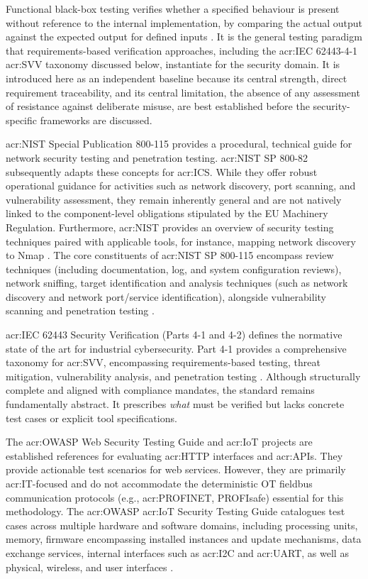 Functional black-box testing verifies whether a specified behaviour is present without reference to the internal implementation, by comparing the actual output against the expected output for defined inputs \cite[p. 82]{1341418}. It is the general testing paradigm that requirements-based verification approaches, including the \gls{acr:IEC} 62443-4-1 \gls{acr:SVV} taxonomy discussed below, instantiate for the security domain. It is introduced here as an independent baseline because its central strength, direct requirement traceability, and its central limitation, the absence of any assessment of resistance against deliberate misuse, are best established before the security-specific frameworks are discussed.

\gls{acr:NIST} Special Publication 800-115 provides a procedural, technical guide for network security testing and penetration testing. \gls{acr:NIST} SP 800-82 subsequently adapts these concepts for \gls{acr:ICS}. While they offer robust operational guidance for activities such as network discovery, port scanning, and vulnerability assessment, they remain inherently general and are not natively linked to the component-level obligations stipulated by the EU Machinery Regulation. Furthermore, \gls{acr:NIST} provides an overview of security testing techniques paired with applicable tools, for instance, mapping network discovery to Nmap \cite[p. 65]{nist_sp800_115}. The core constituents of \gls{acr:NIST} SP 800-115 encompass review techniques (including documentation, log, and system configuration reviews), network sniffing, target identification and analysis techniques (such as network discovery and network port/service identification), alongside vulnerability scanning and penetration testing \cite[p. iv]{nist_sp800_115}. 

\gls{acr:IEC} 62443 Security Verification (Parts 4-1 and 4-2) defines the normative state of the art for industrial cybersecurity. Part 4-1 provides a comprehensive taxonomy for \gls{acr:SVV}, encompassing requirements-based testing, threat mitigation, vulnerability analysis, and penetration testing \cite[p. 37]{DIN_EN_IEC_62443_4_1_2018}. Although structurally complete and aligned with compliance mandates, the standard remains fundamentally abstract. It prescribes \textit{what} must be verified but lacks concrete test cases or explicit tool specifications. 

The \gls{acr:OWASP} Web Security Testing Guide and \gls{acr:IoT} projects are established references for evaluating \gls{acr:HTTP} interfaces and \glspl{acr:API}. They provide actionable test scenarios for web services. However, they are primarily \gls{acr:IT}-focused and do not accommodate the deterministic OT fieldbus communication protocols (e.g., \gls{acr:PROFINET}, PROFIsafe) essential for this methodology. The \gls{acr:OWASP} \gls{acr:IoT} Security Testing Guide catalogues test cases across multiple hardware and software domains, including processing units, memory, firmware encompassing installed instances and update mechanisms, data exchange services, internal interfaces such as \gls{acr:I2C} and \gls{acr:UART}, as well as physical, wireless, and user interfaces \cite{owasp_istg}. 

